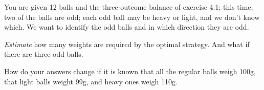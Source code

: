 \begin{problem}{4}{14}
  You are given 12 balls and the three-outcome balance of exercise 4.1; this time, two of the balls are odd; each odd ball may be heavy or light, and we don't know which.  We want to identify the odd balls and in which direction they are odd.
\end{problem}

\begin{subproblem}
  \textit{Estimate} how many weights are required by the optimal strategy.  And what if there are three odd balls.
\end{subproblem}

\begin{subproblem}
  How do your answers change if it is known that all the regular balls weigh 100g, that light balls weight 99g, and heavy ones weigh 110g.
\end{subproblem}



